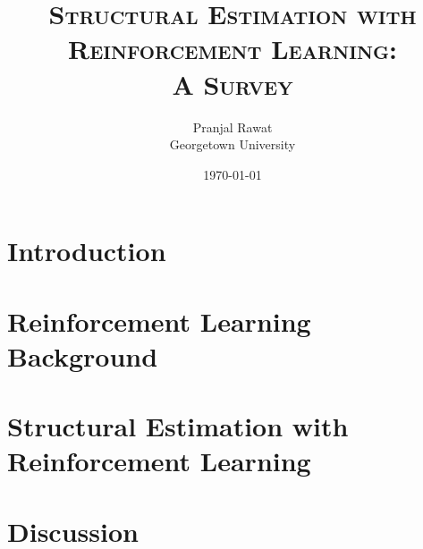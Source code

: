 




\title{\textsc{Structural Estimation with Reinforcement Learning:\\ A Survey}}
\author{Pranjal Rawat \\ Georgetown University}
\date{\today}

\maketitle

\begin{abstract}
\noindent
\end{abstract}

\tableofcontents
\newpage

\section{Introduction}\label{section:intro}

\section{Reinforcement Learning Background}\label{section:rl_background}


\section{Structural Estimation with Reinforcement Learning}\label{section:rl_econ_models}


\section{Discussion}\label{section:conclusion}





